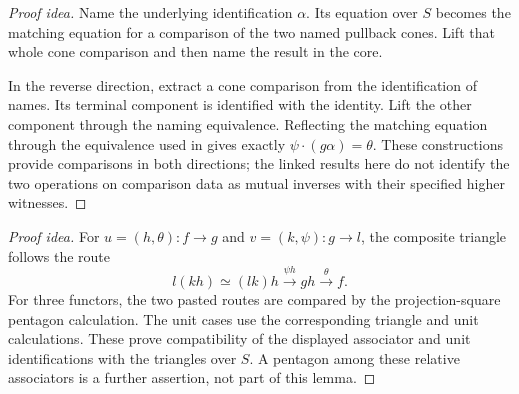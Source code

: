 \documentclass[11pt]{article}
\begin{document}
\begin{proof}[Proof idea]
Name the underlying identification $\alpha$. Its equation over $S$ becomes
the matching equation for a comparison of the two named pullback cones.
Lift that whole cone comparison and then name the result in the core.

In the reverse direction, extract a cone comparison from the identification
of names. Its terminal component is identified with the identity. Lift the
other component through the naming equivalence. Reflecting the matching
equation through the equivalence used in 
gives exactly $\psi\cdot(g\alpha)=\theta$.
These constructions provide comparisons in both directions; the linked
results here do not identify the two operations on comparison data as
mutual inverses with their specified higher witnesses.
\end{proof}

\begin{proof}[Proof idea]
For $u=(h,\theta)\colon f\to g$ and $v=(k,\psi)\colon g\to l$, the
composite triangle follows the route
\[
 l(kh)\simeq(lk)h\xrightarrow{\psi h}gh\xrightarrow{\theta}f.
\]
For three functors, the two pasted routes are compared by the
projection-square pentagon calculation. The unit cases use the corresponding
triangle and unit calculations. These prove compatibility of the displayed
associator and unit identifications with the triangles over $S$.
A pentagon among these relative associators is a further assertion, not part
of this lemma.
\end{proof}
\end{document}
